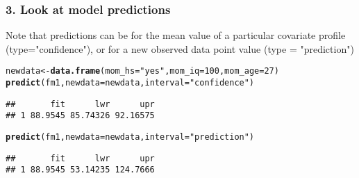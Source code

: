 \documentclass[table]{beamer}\usepackage[]{graphicx}\usepackage[]{color}
\makeatletter
\newcommand{\hlnum}[1]{\textcolor[rgb]{0.686,0.059,0.569}{#1}}%
\newcommand{\hlstr}[1]{\textcolor[rgb]{0.192,0.494,0.8}{#1}}%
\newcommand{\hlstd}[1]{\textcolor[rgb]{0.345,0.345,0.345}{#1}}%
\newcommand{\hlkwb}[1]{\textcolor[rgb]{0.69,0.353,0.396}{#1}}%
\newcommand{\hlkwc}[1]{\textcolor[rgb]{0.333,0.667,0.333}{#1}}%
\newcommand{\hlkwd}[1]{\textcolor[rgb]{0.737,0.353,0.396}{\textbf{#1}}}%
\newenvironment{kframe}{%
 \def\at@end@of@kframe{}%
 \ifinner\ifhmode%
  \def\at@end@of@kframe{\end{minipage}}%
  \begin{minipage}{\columnwidth}%
 \fi\fi%
 \def\FrameCommand##1{\hskip\@totalleftmargin \hskip-\fboxsep
 \colorbox{shadecolor}{##1}\hskip-\fboxsep
     \hskip-\linewidth \hskip-\@totalleftmargin \hskip\columnwidth}%
 \MakeFramed {\advance\hsize-\width
   \@totalleftmargin\z@ \linewidth\hsize
   \@setminipage}}%
 {\par\unskip\endMakeFramed%
 \at@end@of@kframe}
\newenvironment{knitrout}{}{} %
\makeatother
\begin{document}


\begin{frame}[fragile]
\frametitle{3. Look at model predictions}

Note that predictions can be for the mean value of a particular covariate profile (type="confidence"), or for a new observed data point value (type = "prediction")
\scriptsize
\begin{knitrout}
\color{fgcolor}\begin{kframe}
\begin{alltt}
\hlstd{newdata} \hlkwb{<-} \hlkwd{data.frame}\hlstd{(}\hlkwc{mom_hs} \hlstd{=} \hlstr{"yes"}\hlstd{,} \hlkwc{mom_iq} \hlstd{=} \hlnum{100}\hlstd{,} \hlkwc{mom_age} \hlstd{=} \hlnum{27}\hlstd{)}
\hlkwd{predict}\hlstd{(fm1,} \hlkwc{newdata} \hlstd{= newdata,} \hlkwc{interval} \hlstd{=} \hlstr{"confidence"}\hlstd{)}
\end{alltt}
\begin{verbatim}
##       fit      lwr      upr
## 1 88.9545 85.74326 92.16575
\end{verbatim}
\begin{alltt}
\hlkwd{predict}\hlstd{(fm1,} \hlkwc{newdata} \hlstd{= newdata,} \hlkwc{interval} \hlstd{=} \hlstr{"prediction"}\hlstd{)}
\end{alltt}
\begin{verbatim}
##       fit      lwr      upr
## 1 88.9545 53.14235 124.7666
\end{verbatim}
\end{kframe}
\end{knitrout}

\end{frame}



\end{document}
